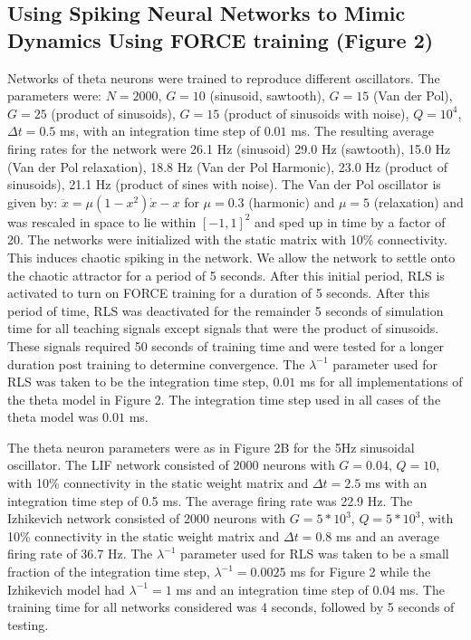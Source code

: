 \documentclass[11pt]{article} %
\begin{document}
\subsection*{Using Spiking Neural Networks to Mimic Dynamics Using FORCE training (Figure 2)} 

Networks of theta neurons were trained to reproduce different oscillators.  The parameters were: $N=2000$, $G=10$ (sinusoid, sawtooth), $G = 15$ (Van der Pol), $G=25$ (product of sinusoids), $G=15$ (product of sinusoids with noise), $Q = 10^4$, $\Delta t = 0.5$ ms, with an integration time step of $0.01$ ms.   The resulting average firing rates for the network were 26.1 Hz (sinusoid) 29.0 Hz (sawtooth), 15.0 Hz (Van der Pol relaxation), 18.8 Hz (Van der Pol Harmonic), 23.0 Hz (product of sinusoids), 21.1 Hz (product of sines with noise). The Van der Pol oscillator is given by: $\ddot{x}  = \mu(1-x^2)\dot{x} - x$ for $\mu = 0.3$ (harmonic) and $\mu = 5$ (relaxation)  and was rescaled in space to lie within $[-1,1]^2$  and sped up in time by a factor of 20.    The networks were initialized with the static matrix with 10\% connectivity.  This induces chaotic spiking in the network.  We allow the network to settle onto the chaotic attractor for a period of 5 seconds.  After this initial period,  RLS is activated to turn on FORCE training for a duration of 5 seconds.  After this period of time, RLS was deactivated for the remainder 5 seconds of simulation time for all teaching signals except signals that were the product of sinusoids.  These signals required 50 seconds of training time and were tested for a longer duration post training to determine convergence.   The $\lambda^{-1}$ parameter used for RLS was taken to be the integration time step, $0.01$ ms for all implementations of the theta model in Figure 2.  The integration time step used in all cases of the theta model was $0.01$ ms.  

The theta neuron parameters were as in Figure 2B for the 5Hz sinusoidal oscillator.  The LIF network consisted of 2000 neurons with $G=0.04$, $Q = 10$, with 10\% connectivity in the static weight matrix and $\Delta t = 2.5$ ms with an integration time step of 0.5 ms.  The average firing rate was 22.9 Hz.   The Izhikevich network consisted of 2000 neurons with $G =5*10^3 $, $Q = 5*10^3$, with 10\% connectivity in the static weight matrix and $\Delta t =  0.8 $ ms and an average firing rate of 36.7 Hz.  The $\lambda^{-1}$ parameter used for RLS was taken to be a small fraction of the integration time step, $\lambda^{-1} = 0.0025$ ms for Figure 2 while the Izhikevich model had $\lambda^{-1} = 1$ ms and an integration time step of $0.04$ ms.    The training time for all networks considered was 4 seconds, followed by 5 seconds of testing.  
\end{document}
